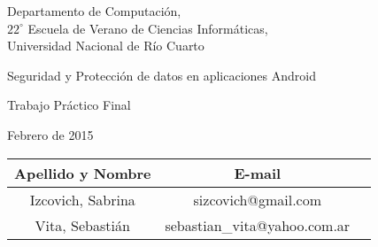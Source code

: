 \documentclass[10pt, a4paper]{article}
\author{Seguridad Android.}
\date{}								%
\begin{document}
\thispagestyle{caratula}

\begin{center}

\vspace{2cm}

Departamento de Computación,\\
$22^{\circ}$ Escuela de Verano de Ciencias Informáticas,\\
Universidad Nacional de Río Cuarto

\vspace{4cm}

\begin{Huge}
Seguridad y Protección de datos en aplicaciones Android\end{Huge}

\vspace{0.5cm}

\begin{huge}
Trabajo Práctico Final
\end{huge}

\vspace{1cm}

Febrero de 2015

\vspace{10cm}


\vspace{1cm}

\begin{tabular}{|c|c|c|}
\hline
Apellido y Nombre & E-mail\\
\hline
Izcovich, Sabrina      & sizcovich@gmail.com\\
Vita, Sebastián        & sebastian\_vita@yahoo.com.ar\\
\hline
\end{tabular}

\end{center}

\newpage
\end{document}
